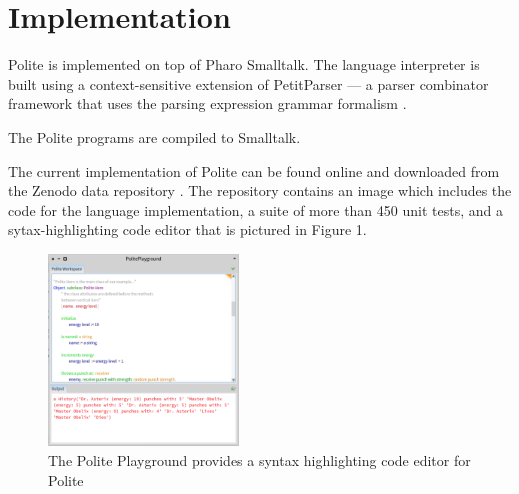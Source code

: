 

\section{Implementation}
Polite is implemented on top of Pharo Smalltalk. The language interpreter is built using a context-sensitive extension of PetitParser --- a parser combinator framework that uses the parsing expression grammar formalism \cite{Kurs14a-ParsingContext}. 

The Polite programs are compiled to Smalltalk.

The current implementation of Polite can be found online and downloaded from  the Zenodo data repository \cite{kurs16-polite}. The repository contains an image which includes the code for the language implementation, a suite of more than 450 unit tests, and a sytax-highlighting code editor that is pictured in Figure 1. 

\begin{figure}[h]
	\centering
	\includegraphics[width=0.45\textwidth]{images/playground.png}
	\caption{The Polite Playground provides a syntax highlighting code editor for Polite}
	\label{fig:figure1}
\end{figure}